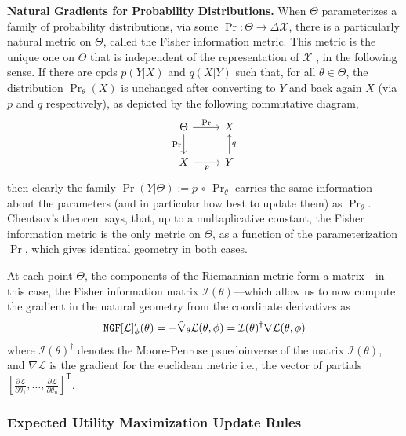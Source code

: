\documentclass{uai2023}
\let\parencite\citep
\theoremstyle{plain}
\theoremstyle{definition}
\newcommand\X{\mathcal X}
\begin{document}
\textbf{Natural Gradients for Probability Distributions.}
When $\Theta$ parameterizes a family of probability distributions, via some $\Pr : \Theta \to \Delta \X$, there is a particularly natural metric on $\Theta$, called the Fisher information metric.
This metric is the unique one on $\Theta$ that is
independent of the representation of $\X$ \parencite{chentsov}, in the following sense.
If there are cpds $p(Y|X)$ and $q(X|Y)$ such that, for all $\theta \in \Theta$,
the distribution $\Pr_{\theta}(X)$ is unchanged after converting to $Y$ and back again $X$ (via $p$ and $q$ respectively), as depicted by the following commutative diagram,
\[
\begin{tikzcd}
		\Theta \ar[r,"\Pr"]\ar[d,"\Pr"']
& X \\
		X \ar[r,"p"'] & Y \ar[u, "q"']
	\end{tikzcd}
\]
then clearly the family $\Pr(Y|\Theta) := p\,\circ\,\Pr_{\theta}$ carries the same information about the parameters (and in particular how best to update them) as $\Pr_\theta$.
Chentsov's theorem says, that, up to a multaplicative constant, the Fisher information metric is the only metric on $\Theta$, as a function of the parameterization $\Pr$, which gives identical geometry in both cases.



At each point $\Theta$, the components of the Riemannian metric form a matrix---in this case, the Fisher information matrix $\mathcal I(\theta)$---which allow us to now compute the gradient in the natural geometry from the coordinate derivatives as
\[
	\mathtt{NGF}[\cal L]'_\phi (\theta) = - \hat \nabla_\theta \mathcal L(\theta,\phi)
= \mathcal I(\theta)^{\dagger}  \nabla \mathcal L(\theta, \phi)
\]
where $ \mathcal I(\theta)^{\dagger} $ denotes the Moore-Penrose psuedoinverse of the matrix $ \mathcal I(\theta)$,
and $\nabla \mathcal L$ is the gradient for the euclidean metric i.e., the vector of partials $[\frac{\partial \mathcal L}{\partial \theta_1}, \ldots, \frac{\partial \mathcal L}{\partial \theta_n}]^{\mathsf T}$.




\subsubsection{Expected Utility Maximization Update Rules}





\def\Bolz#1{\mathrm{Bolz}[#1]}
\end{document}
